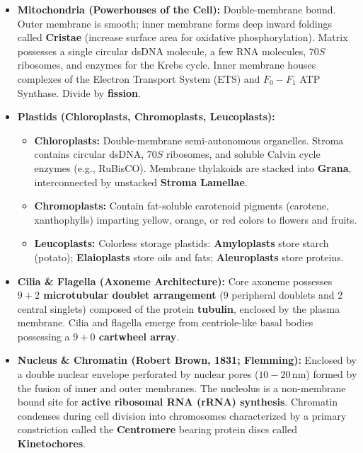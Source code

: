 \documentclass[10pt,twoside,openright]{book}
\begin{document}
\begin{conceptbox}
\begin{itemize}[leftmargin=*]
  \item \textbf{Mitochondria (Powerhouses of the Cell):}
  Double-membrane bound. Outer membrane is smooth; inner membrane forms deep inward foldings called \textbf{Cristae} (increase surface area for oxidative phosphorylation). Matrix possesses a single circular dsDNA molecule, a few RNA molecules, $70S$ ribosomes, and enzymes for the Krebs cycle. Inner membrane houses complexes of the Electron Transport System (ETS) and $F_0-F_1$ ATP Synthase. Divide by \textbf{fission}.

  \item \textbf{Plastids (Chloroplasts, Chromoplasts, Leucoplasts):}
  \begin{itemize}
    \item \textbf{Chloroplasts:} Double-membrane semi-autonomous organelles. Stroma contains circular dsDNA, $70S$ ribosomes, and soluble Calvin cycle enzymes (e.g., RuBisCO). Membrane thylakoids are stacked into \textbf{Grana}, interconnected by unstacked \textbf{Stroma Lamellae}.
    \item \textbf{Chromoplasts:} Contain fat-soluble carotenoid pigments (carotene, xanthophylls) imparting yellow, orange, or red colors to flowers and fruits.
    \item \textbf{Leucoplasts:} Colorless storage plastids: \textbf{Amyloplasts} store starch (potato); \textbf{Elaioplasts} store oils and fats; \textbf{Aleuroplasts} store proteins.
  \end{itemize}

  \item \textbf{Cilia \& Flagella (Axoneme Architecture):}
  Core axoneme possesses \textbf{$9 + 2$ microtubular doublet arrangement} (9 peripheral doublets and 2 central singlets) composed of the protein \textbf{tubulin}, enclosed by the plasma membrane. Cilia and flagella emerge from centriole-like basal bodies possessing a \textbf{$9 + 0$ cartwheel array}.

  \item \textbf{Nucleus \& Chromatin (Robert Brown, 1831; Flemming):}
  Enclosed by a double nuclear envelope perforated by nuclear pores ($10-20\,\mathrm{nm}$) formed by the fusion of inner and outer membranes. The nucleolus is a non-membrane bound site for \textbf{active ribosomal RNA (rRNA) synthesis}. Chromatin condenses during cell division into chromosomes characterized by a primary constriction called the \textbf{Centromere} bearing protein discs called \textbf{Kinetochores}.
\end{itemize}
\end{conceptbox}
\end{document}

